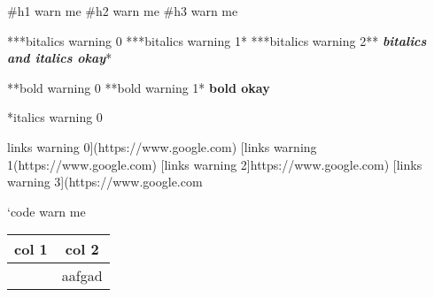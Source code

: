 \documentclass{article}
\begin{document}
#h1 warn me
#h2 warn me
#h3 warn me

***bitalics warning 0
***bitalics warning 1*
***bitalics warning 2**
\textbf{\textit{bitalics and italics okay}}*

**bold warning 0
**bold warning 1*
\textbf{bold okay}

*italics warning 0

links warning 0](https://www.google.com)
[links warning 1(https://www.google.com)
[links warning 2]https://www.google.com)
[links warning 3](https://www.google.com

`code warn me

\begin{tabular}{|c|c|}
  \hline
  col 1 & col 2\\
  \hline
   & aafgad\\
  \hline
\end{tabular}
\end{document}
